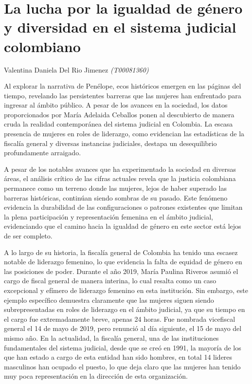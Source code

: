 \documentclass[letterpaper, 12pt]{article}
\begin{document}
\section*{La lucha por la igualdad de género y diversidad en el sistema judicial colombiano}

\noindent\makebox[\linewidth]{\rule{\textwidth}{0.4pt}}

Valentina Daniela Del Rio Jimenez \textit{(T00081360)}

\noindent\makebox[\linewidth]{\rule{\textwidth}{0.4pt}}

Al explorar la narrativa de Penélope, ecos históricos
emergen en las páginas del tiempo, revelando las
persistentes barreras que las mujeres han enfrentado para
ingresar al ámbito público. A pesar de los avances en la
sociedad, los datos proporcionados por María Adelaida
Ceballos ponen al descubierto de manera cruda la realidad
contemporánea del sistema judicial en Colombia. La escasa
presencia de mujeres en roles de liderazgo, como evidencian
las estadísticas de la fiscalía general y diversas
instancias judiciales, destapa un desequilibrio
profundamente arraigado.

A pesar de los notables avances que ha experimentado la
sociedad en diversas áreas, el análisis crítico de las
cifras actuales revela que la justicia colombiana permanece
como un terreno donde las mujeres, lejos de haber superado
las barreras históricas, continúan siendo sombras de su
pasado. Este fenómeno evidencia la durabilidad de las
configuraciones o patrones existentes que limitan la plena
participación y representación femenina en el ámbito
judicial, evidenciando que el camino hacia la igualdad de
género en este sector está lejos de ser completo.

A lo largo de su historia, la fiscalía general de Colombia
ha tenido una escasez notable de liderazgo femenino, lo que
evidencia la falta de equidad de género en las posiciones
de poder. Durante el año 2019, María Paulina Riveros asumió
el cargo de fiscal general de manera interina, lo cual
resalta como un caso excepcional y efímero de liderazgo
femenino en esta institución. Sin embargo, este ejemplo
específico demuestra claramente que las mujeres siguen
siendo subrepresentadas en roles de liderazgo en el ámbito
judicial, ya que su tiempo en el cargo fue extremadamente
breve, apenas 24 horas. Fue nombrada vicefiscal general el
14 de mayo de 2019, pero renunció al día siguiente, el 15
de mayo del mismo año. En la actualidad, la fiscalía
general, una de las instituciones fundamentales del sistema
judicial, desde que se creó en 1991, la mayoría de los que
han estado a cargo de esta entidad han sido hombres, en
total 14 lideres masculinos han ocupado el puesto, lo que
deja claro que las mujeres han tenido muy poca
representación en la dirección de esta organización.
\end{document}
